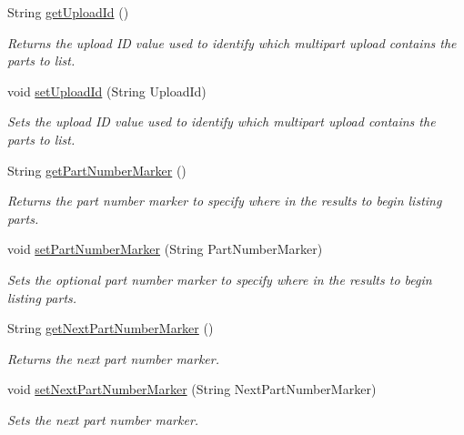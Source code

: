 \begin{DoxyCompactItemize}
String \hyperlink{classorg_1_1jcs_1_1dss_1_1main_1_1PartListing_a8fef7655c66922166990b0562691a2b3}{get\+Upload\+Id} ()
\begin{DoxyCompactList}\small\item\em Returns the upload ID value used to identify which multipart upload contains the parts to list. \end{DoxyCompactList}\item 
void \hyperlink{classorg_1_1jcs_1_1dss_1_1main_1_1PartListing_aeeecc3333389762e2ba3e4e84f29e4b4}{set\+Upload\+Id} (String Upload\+Id)
\begin{DoxyCompactList}\small\item\em Sets the upload ID value used to identify which multipart upload contains the parts to list. \end{DoxyCompactList}\item 
String \hyperlink{classorg_1_1jcs_1_1dss_1_1main_1_1PartListing_a02d267a99d438d0a7e306af066ca80aa}{get\+Part\+Number\+Marker} ()
\begin{DoxyCompactList}\small\item\em Returns the part number marker to specify where in the results to begin listing parts. \end{DoxyCompactList}\item 
void \hyperlink{classorg_1_1jcs_1_1dss_1_1main_1_1PartListing_a333f132b39e12add18682415c5aac0df}{set\+Part\+Number\+Marker} (String Part\+Number\+Marker)
\begin{DoxyCompactList}\small\item\em Sets the optional part number marker to specify where in the results to begin listing parts. \end{DoxyCompactList}\item 
String \hyperlink{classorg_1_1jcs_1_1dss_1_1main_1_1PartListing_aead272b399507411a54e1248b0ecd171}{get\+Next\+Part\+Number\+Marker} ()
\begin{DoxyCompactList}\small\item\em Returns the next part number marker. \end{DoxyCompactList}\item 
void \hyperlink{classorg_1_1jcs_1_1dss_1_1main_1_1PartListing_a49ba90f02b84ef0ad5c62ae644708f9f}{set\+Next\+Part\+Number\+Marker} (String Next\+Part\+Number\+Marker)
\begin{DoxyCompactList}\small\item\em Sets the next part number marker. \end{DoxyCompactList}\item 

\end{DoxyCompactItemize}
